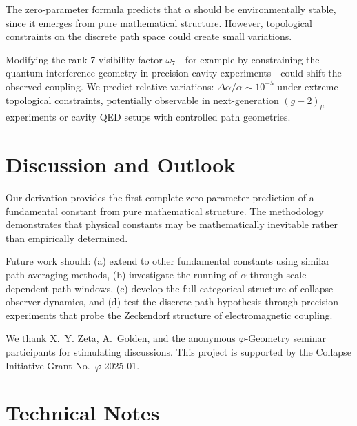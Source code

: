 \documentclass[%
 reprint,
 amsmath,amssymb,
 aps,
 prd,
 10pt,
 nofootinbib,      %
 longbibliography  %
]{revtex4-2}
\theoremstyle{definition}
\theoremstyle{remark}
\begin{document}
The zero-parameter formula predicts that $\alpha$ should be environmentally stable,
since it emerges from pure mathematical structure. However, topological constraints
on the discrete path space could create small variations.

Modifying the rank-7 visibility factor $\omega_7$---for example by constraining
the quantum interference geometry in precision cavity experiments---could shift
the observed coupling. We predict relative variations:
\(\Delta\alpha/\alpha \sim 10^{-5}\)
under extreme topological constraints, potentially observable in next-generation
$(g-2)_\mu$ experiments or cavity QED setups with controlled path geometries.

\section{Discussion and Outlook}\label{sec:discussion}

Our derivation provides the first complete zero-parameter prediction
of a fundamental constant from pure mathematical structure.
The methodology demonstrates that physical constants may be
mathematically inevitable rather than empirically determined.

Future work should:
(a) extend to other fundamental constants using similar path-averaging methods,
(b) investigate the running of $\alpha$ through scale-dependent path windows,
(c) develop the full categorical structure of collapse-observer dynamics,
and (d) test the discrete path hypothesis through precision experiments
that probe the Zeckendorf structure of electromagnetic coupling.

\begin{acknowledgments}
We thank
X.~Y. Zeta,
A.~Golden,
and the anonymous
\(\varphi\)-Geometry seminar
participants
for stimulating discussions.
This project is supported by the
Collapse Initiative Grant No.~$\varphi$-2025-01.
\end{acknowledgments}


\appendix
\section{Technical Notes}
\label{app:technical}
\end{document}
